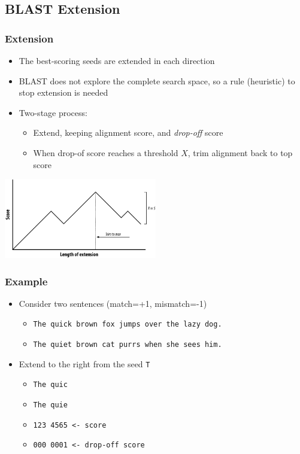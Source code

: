 %

\subsection{BLAST Extension}
\begin{frame}
  \frametitle{Extension}
  \begin{itemize}
    \item The best-scoring seeds are extended in each direction
    \item BLAST does not explore the complete search space, so a rule (heuristic) to stop extension is needed
    \item Two-stage process:
    \begin{itemize}
      \item Extend, keeping alignment score, and \emph{drop-off} score
      \item When drop-of score reaches a threshold $X$, trim alignment back to top score
    \end{itemize}
  \end{itemize}
  \begin{center}
    \includegraphics[width=0.5\textwidth]{images/extension} 
  \end{center}    
\end{frame}

\begin{frame}
  \frametitle{Example}
  \begin{itemize}
    \item<1-> Consider two sentences (match=+1, mismatch=-1)
    \begin{itemize}
      \item \texttt{The quick brown fox jumps over the lazy dog.}
      \item \texttt{The quiet brown cat purrs when she sees him.}
    \end{itemize}
    \item<2-> Extend to the right from the seed \texttt{T}
    \begin{itemize}
      \item \texttt{The quic}
      \item \texttt{The quie}
      \item \texttt{123 4565 <- score}
      \item \texttt{000 0001 <- drop-off score}        
    \end{itemize}
  \end{itemize}
\end{frame}

